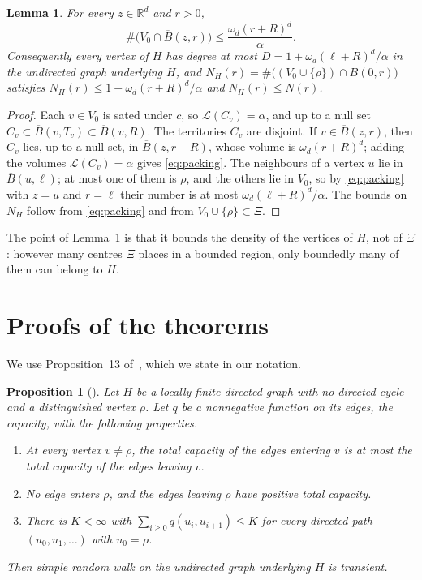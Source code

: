 \documentclass[11pt]{amsart}
\newtheorem{lemma}[theorem]{Lemma}
\newtheorem{proposition}[theorem]{Proposition}
\theoremstyle{remark}
\numberwithin{equation}{section}
\newcommand{\R}{\mathbb{R}}
\newcommand{\Leb}{\mathcal{L}}
\begin{document}
\begin{lemma}\label{lem:packing}
For every $z\in\R^d$ and $r>0$,
\begin{equation}\label{eq:packing}
\#\bigl(V_0\cap \overline B(z,r)\bigr)\le\frac{\omega_d(r+R)^d}{\alpha}.
\end{equation}
Consequently every vertex of $H$ has degree at most $D=1+\omega_d(\ell+R)^d/\alpha$ in the undirected graph underlying $H$, and $N_H(r)=\#\bigl((V_0\cup\{\rho\})\cap B(0,r)\bigr)$ satisfies $N_H(r)\le1+\omega_d(r+R)^d/\alpha$ and $N_H(r)\le N(r)$.
\end{lemma}

\begin{proof}
Each $v\in V_0$ is sated under $c$, so $\Leb(C_v)=\alpha$, and up to a null set $C_v\subset\overline{B}(v,T_v)\subset\overline{B}(v,R)$. The territories $C_v$ are disjoint. If $v\in\overline B(z,r)$, then $C_v$ lies, up to a null set, in $\overline{B}(z,r+R)$, whose volume is $\omega_d(r+R)^d$; adding the volumes $\Leb(C_v)=\alpha$ gives \eqref{eq:packing}. The neighbours of a vertex $u$ lie in $\overline B(u,\ell)$; at most one of them is $\rho$, and the others lie in $V_0$, so by \eqref{eq:packing} with $z=u$ and $r=\ell$ their number is at most $\omega_d(\ell+R)^d/\alpha$. The bounds on $N_H$ follow from \eqref{eq:packing} and from $V_0\cup\{\rho\}\subset\Xi$.
\end{proof}

The point of Lemma~\ref{lem:packing} is that it bounds the density of the vertices of $H$, not of $\Xi$: however many centres $\Xi$ places in a bounded region, only boundedly many of them can belong to $H$.

\section{Proofs of the theorems}\label{sec:proofs}

We use Proposition~13 of~\cite{HHP}, which we state in our notation.

\begin{proposition}[{\cite[Proposition~13]{HHP}}]\label{prop:HHP}
Let $H$ be a locally finite directed graph with no directed cycle and a distinguished vertex $\rho$. Let $q$ be a nonnegative function on its edges, the capacity, with the following properties.
\begin{enumerate}
\item[(i)] At every vertex $v\ne\rho$, the total capacity of the edges entering $v$ is at most the total capacity of the edges leaving $v$.
\item[(ii)] No edge enters $\rho$, and the edges leaving $\rho$ have positive total capacity.
\item[(iii)] There is $K<\infty$ with $\sum_{i\ge0}q(u_i,u_{i+1})\le K$ for every directed path $(u_0,u_1,\dots)$ with $u_0=\rho$.
\end{enumerate}
Then simple random walk on the undirected graph underlying $H$ is transient.
\end{proposition}
\end{document}
